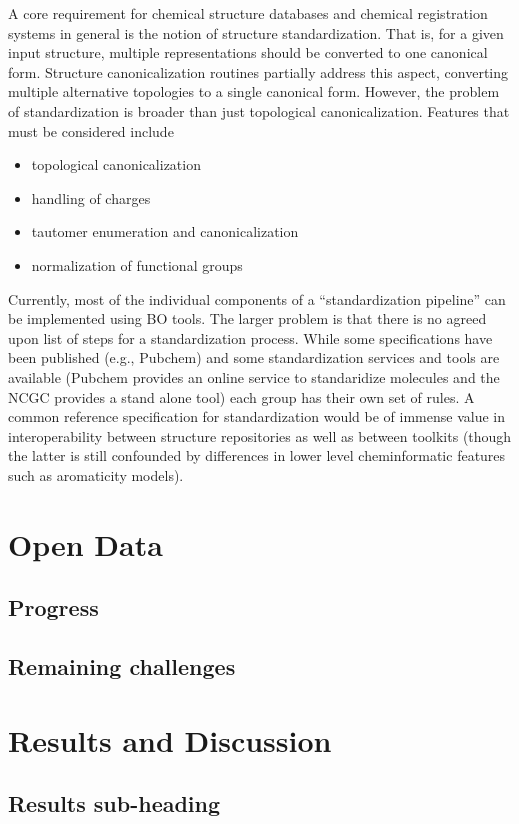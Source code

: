 \documentclass[10pt]{bmc_article}
\newenvironment{bmcformat}{\begin{raggedright}\baselineskip20pt\sloppy\setboolean{publ}{false}}{\end{raggedright}\baselineskip20pt\sloppy}
\begin{document}
\begin{bmcformat}
A core requirement for chemical structure databases and chemical
registration systems in general is the notion of structure
standardization.  That is,  for a given input structure, multiple
representations should be converted to one canonical form. 
Structure canonicalization routines partially address this aspect,
converting multiple alternative topologies to a single canonical
form. However, the problem of standardization is broader than just
topological canonicalization. Features that must be considered include
\begin{itemize}
\item topological canonicalization
\item handling of charges
\item tautomer enumeration and canonicalization
\item normalization of functional groups
\end{itemize}
Currently, most of the individual components of a ``standardization
pipeline'' can be implemented using BO tools. The larger problem is
that there is no agreed upon list of steps for a standardization
process. While some specifications have been published (e.g., Pubchem)
and some standardization services and tools are available (Pubchem
provides an online service to standaridize molecules and the NCGC
provides a stand alone tool) each group has their own set of rules. A
common reference specification for standardization would be of immense
value in interoperability between structure repositories as well as
between toolkits (though the latter is still confounded by differences
in lower level cheminformatic features such as aromaticity models).

\section*{Open Data}
  \subsection*{Progress}
  \subsection*{Remaining challenges}

\section*{Results and Discussion}
  \subsection*{Results sub-heading}

\end{bmcformat}
\end{document}
